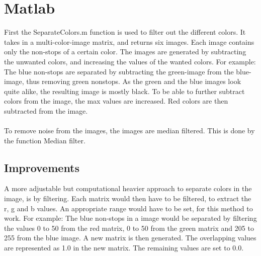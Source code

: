 \lstset{language=Matlab}
\lstset{frame=single}
\section{Matlab}
First the SeparateColors.m function is used to filter out the different colors. It takes in a multi-color-image matrix, and returns six images. Each image contains only the non-stops of a certain color. The images are generated by subtracting the unwanted colors, and increasing the values of the wanted colors.
For example: The blue non-stops are separated by subtracting the green-image from the blue-image, thus removing green nonstops. As the green and the blue images look quite alike, the resulting image is mostly black. To be able to further subtract colors from the image, the max values are increased. Red colors are then subtracted from the image.
\\

\\
To remove noise from the images, the images are median filtered. This is done by the function Median filter. 

\subsection{Improvements}
A more adjustable but computational heavier approach to separate colors in the image, is by filtering. Each matrix would then have to be filtered, to extract the r, g and b values. An appropriate range would have to be set, for this method to work. For example: The blue non-stops in a image would be separated by filtering the values 0 to 50 from the red matrix, 0 to 50 from the green matrix and 205 to 255 from the blue image. A new matrix is then generated. The overlapping values are represented as 1.0 in the new matrix. The remaining values are set to 0.0. 
\\



